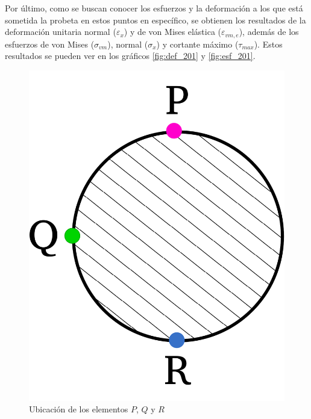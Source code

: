 
\newpage

Por último, como se buscan conocer los esfuerzos y la deformación a los que está sometida la probeta en estos puntos en específico, se obtienen los resultados de la deformación unitaria normal ($\varepsilon_x$) y de von Mises elástica ($\varepsilon_{vm,e}$), además de los esfuerzos de von Mises ($\sigma_{vm}$), normal ($\sigma_x$) y cortante máximo ($\tau_{max}$). Estos resultados se pueden ver en los gráficos \ref{fig:def_201} y \ref{fig:esf_201}.

\begin{figure}[h]
\centering
\includegraphics[width=0.2\linewidth]{Imagenes/diagelem_pqr.pdf}
\caption{Ubicación de los elementos $P$, $Q$ y $R$}
\label{fig:diag_pqr2}
\end{figure}

